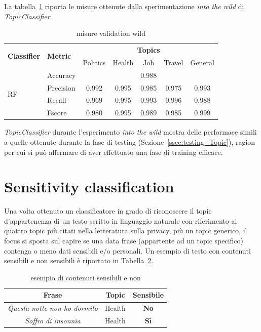 La tabella~\ref{tbl:testing_wild} riporta le misure ottenute dalla sperimentazione \textit{into the wild} di \textit{TopicClassifier}. 
\begin{table}[h]
\begin{tabular}{|l|l|c|c|c|c|c|}
\hline
\multirow{2}{*}{\textbf{Classifier}} & \multirow{2}{*}{\textbf{Metric}} & \multicolumn{5}{c|}{\textbf{Topics}} \\ \cline{3-7} 
 &  & Politics & Health & Job & Travel & General \\ \hline
\multirow{4}{*}{RF} & Accuracy & \multicolumn{5}{c|}{0.988} \\ \cline{2-7} 
 & Precision & 0.992 & 0.995 & 0.985 & 0.975 & 0.993 \\ \cline{2-7} 
 & Recall & 0.969 & 0.995 & 0.993 & 0.996 & 0.988 \\ \cline{2-7} 
 & Fscore & 0.980 & 0.995 & 0.989 & 0.985 & 0.999 \\ \hline
\end{tabular}
\caption{misure validation wild}
\label{tbl:testing_wild}
\end{table}
\FloatBarrier
\textit{TopicClassifier} durante l'esperimento \textit{into the wild} mostra delle performace simili a quelle ottenute durante la fase di testing (Sezione~\ref{ssec:testing_Topic}), ragion per cui si può affermare di aver effettuato una fase di training efficace.

\section{Sensitivity classification}
\label{sec:sensclass}
Una volta ottenuto un classificatore in grado di riconoscere il topic d'appartenenza di un testo scritto in linguaggio naturale con riferimento ai quattro topic più citati nella letteratura sulla privacy, più un topic generico, il focus si sposta sul capire se una data frase (appartente ad un topic specifico) contenga o meno dati sensibili e/o personali. Un esempio di testo con contenuti sensibili e non sensibili è riportato in Tabella~\ref{tbl:example_sens}.

\begin{table}[h]

\centering
\begin{tabular}{c|c|c}
\hline
\textbf{Frase} & \textbf{Topic} & \textbf{Sensibile} \\ \hline
\textit{Questa notte non ho dormito} & Health & \textbf{No} \\ \hline
\textit{Soffro di insonnia} & Health & \textbf{Sì} \\ \hline
\end{tabular}
\caption{esempio di contenuti sensibili e non}
\label{tbl:example_sens}
\end{table}
\FloatBarrier

